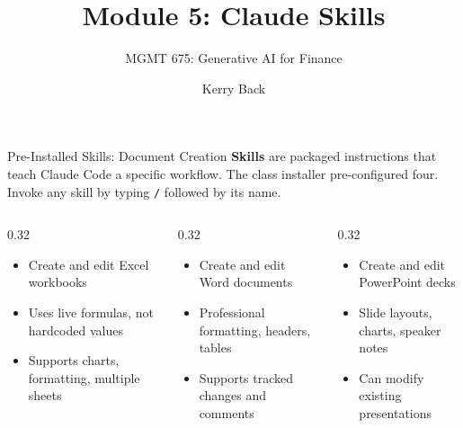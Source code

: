 \documentclass[aspectratio=169]{beamer}
\subtitle{MGMT 675: Generative AI for Finance}
\title{Module 5: Claude Skills}
\author{Kerry Back}
\date{}
\begin{document}
\maketitle

\begin{frame}{Pre-Installed Skills: Document Creation}
\textbf{Skills} are packaged instructions that teach Claude Code a specific workflow.  The class installer pre-configured four.  Invoke any skill by typing \texttt{/} followed by its name.
\vspace{0.3cm}
\begin{columns}[T]
\begin{column}{0.32\textwidth}
\begin{shadedbox}[title=\textbf{/xlsx}]
\begin{itemize}\footnotesize
  \item Create and edit Excel workbooks
  \item Uses \alert{live formulas}, not hardcoded values
  \item Supports charts, formatting, multiple sheets
\end{itemize}
\end{shadedbox}
\end{column}
\begin{column}{0.32\textwidth}
\begin{shadedbox}[title=\textbf{/docx}]
\begin{itemize}\footnotesize
  \item Create and edit Word documents
  \item Professional formatting, headers, tables
  \item Supports tracked changes and comments
\end{itemize}
\end{shadedbox}
\end{column}
\begin{column}{0.32\textwidth}
\begin{shadedbox}[title=\textbf{/pptx}]
\begin{itemize}\footnotesize
  \item Create and edit PowerPoint decks
  \item Slide layouts, charts, speaker notes
  \item Can modify existing presentations
\end{itemize}
\end{shadedbox}
\end{column}
\end{columns}
\end{frame}
\end{document}
